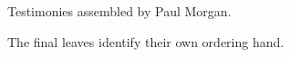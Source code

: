 \typethresholdexception

Testimonies assembled by Paul Morgan.\par
The final leaves identify their own ordering hand.\par

\ornament
